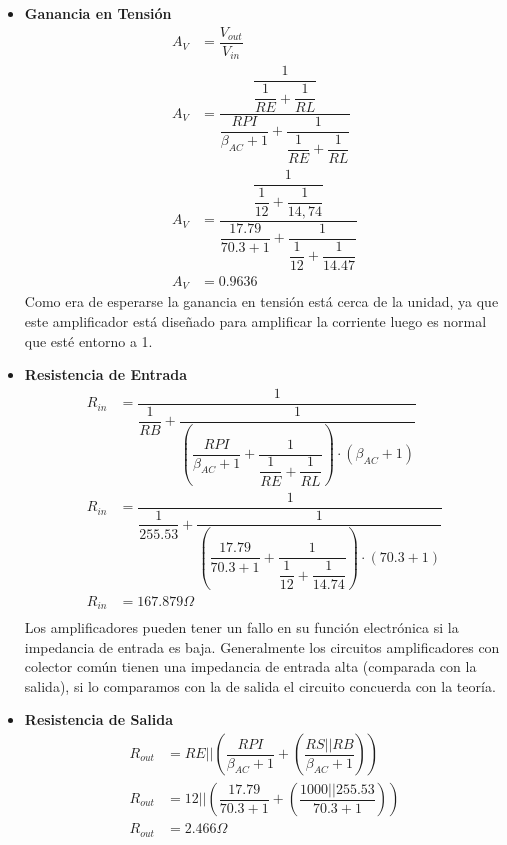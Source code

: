 \begin{itemize}
\item \textbf{Ganancia en Tensión}
  \begin{equation}
  \begin{split}
    A_V & = \dfrac{V_{out}}{V_{in}} \\
    A_V & = \dfrac{\dfrac{1}{\dfrac{1}{RE}+\dfrac{1}{RL}}}{\dfrac{RPI}{\beta_{AC}+1}+\dfrac{1}{\dfrac{1}{RE}+\dfrac{1}{RL}}}\\
    A_V & =
    \dfrac{\dfrac{1}{\dfrac{1}{12}+\dfrac{1}{14,74}}}{\dfrac{17.79}{70.3+1}+\dfrac{1}{\dfrac{1}{12}+\dfrac{1}{14.47}}}\\
    A_V & = 0.9636
  \end{split}
\end{equation}
Como era de esperarse la ganancia en tensión está cerca de la unidad,
ya que este amplificador está diseñado para amplificar la corriente luego es
normal que esté entorno a 1.
\item \textbf{Resistencia de Entrada}
  \begin{equation}
  \begin{split}
    R_{in} & =
    \dfrac{1}{\dfrac{1}{RB}+\dfrac{1}{\left(\dfrac{RPI}{\beta_{AC}+1}+\dfrac{1}{\dfrac{1}{RE}+\dfrac{1}{RL}}\right)
        \cdot (\beta_{AC}+1)}} \\
        R_{in} & = \dfrac{1}{\dfrac{1}{255.53}+\dfrac{1}{\left(\dfrac{17.79}{70.3+1}+\dfrac{1}{\dfrac{1}{12}+\dfrac{1}{14.74}}\right) \cdot (70.3+1)}} \\
    R_{in} & = 167.879 \Omega\\
  \end{split}
\end{equation}
Los amplificadores pueden tener un fallo en su función electrónica si la
impedancia de entrada es baja. Generalmente los circuitos
amplificadores con colector común tienen una impedancia de entrada
alta (comparada con la salida), si lo comparamos con la de salida el
circuito concuerda con la teoría.
\item \textbf{Resistencia de Salida }
    \begin{equation}
  \begin{split}
    R_{out} & = RE ||\left(
      \dfrac{RPI}{\beta_{AC}+1}+\left(\dfrac{RS||RB}{\beta_{AC}+1}\right)\right)\\
        R_{out} & = 12 ||\left( \dfrac{17.79}{70.3+1}+\left(\dfrac{1000||255.53}{70.3+1}\right)\right)\\
    R_{out} & = 2.466 \Omega\\
  \end{split}
\end{equation}


\end{itemize}
